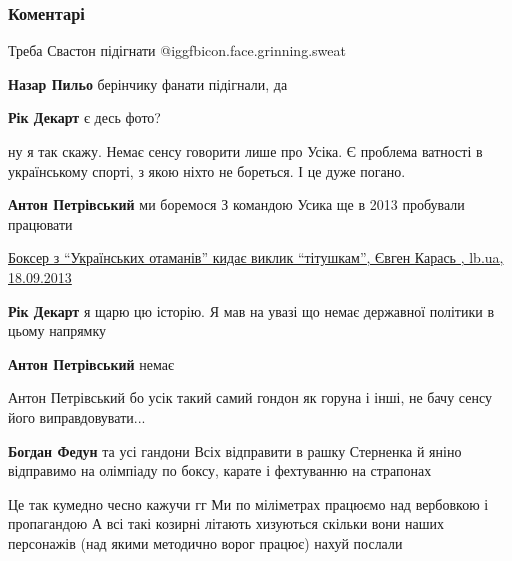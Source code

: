  
 
 
 
 
\subsubsection{Коментарі}
\label{sec:26_09_2021.fb.rik_dekart.1.usik.cmt}

\begin{itemize} %
Треба Свастон підігнати @igg{fbicon.face.grinning.sweat} 

\begin{itemize} %
\textbf{Назар Пильо} берінчику фанати підігнали, да

\textbf{Рік Декарт} є десь фото?
\end{itemize} %


ну я так скажу. Немає сенсу говорити лише про Усіка. Є проблема ватності в
українському спорті, з якою ніхто не бореться. І це дуже погано.

\begin{itemize} %
\textbf{Антон Петрівський} ми боремося
З командою Усика ще в 2013 пробували працювати

\href{https://lb.ua/blog/evgen_karas/227414_sportsmeni_ukraini_naymantsi_vladi.html}{%
Боксер з \enquote{Українських отаманів} кидає виклик \enquote{тітушкам}, Євген Карась , lb.ua, 18.09.2013%
}

\textbf{Рік Декарт} я щарю цю історію. Я мав на увазі що немає державної політики в цьому напрямку

\textbf{Антон Петрівський} немає

Антон Петрівський бо усік такий самий гондон як горуна і інші, не бачу сенсу його виправдовувати...

\textbf{Богдан Федун} та усі гандони
Всіх відправити в рашку
Стерненка й яніно відправимо на олімпіаду по боксу, карате і фехтуванню на страпонах

Це так кумедно чесно кажучи гг
Ми по міліметрах працюємо над вербовкою і пропагандою
А всі такі козирні літають хизуються скільки вони наших персонажів (над якими методично ворог працює) нахуй послали


\end{itemize}
\end{itemize}
